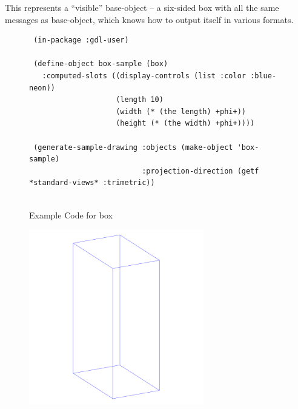\documentclass [11pt]{book}
\begin{document}
\begin{itemize}
\begin{description}
This represents a ``visible'' base-object -- a six-sided box with all the same
messages as base-object, which knows how to output itself in various formats.



\end{description}




\begin{figure}
\begin{lrbox}{\boxedverb}
\begin{minipage}{\linewidth}
{\small

\begin{verbatim}
 (in-package :gdl-user)

 (define-object box-sample (box)
   :computed-slots ((display-controls (list :color :blue-neon))
                    (length 10)
                    (width (* (the length) +phi+))
                    (height (* (the width) +phi+))))

 (generate-sample-drawing :objects (make-object 'box-sample)
                          :projection-direction (getf *standard-views* :trimetric))


\end{verbatim}}
\end{minipage}
\end{lrbox}
\fbox{\usebox{\boxedverb}}

\caption{Example Code for box}

\label{fig:example-code-box}

\end{figure}

\begin{figure}
\begin{center}
\includegraphics[width=3in,height=3in]{../images/example-box.pdf}
\end{center}


\end{figure}
\end{itemize}
\end{document}
